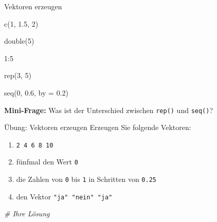 \documentclass[
  10pt,
  ignorenonframetext,
  aspectratio=169,
]{beamer}
\newenvironment{Shaded}{}{}
\newcommand{\AttributeTok}[1]{\textcolor[rgb]{0.49,0.56,0.16}{#1}}
\newcommand{\CommentTok}[1]{\textcolor[rgb]{0.38,0.63,0.69}{\textit{#1}}}
\newcommand{\DecValTok}[1]{\textcolor[rgb]{0.25,0.63,0.44}{#1}}
\newcommand{\FloatTok}[1]{\textcolor[rgb]{0.25,0.63,0.44}{#1}}
\newcommand{\FunctionTok}[1]{\textcolor[rgb]{0.02,0.16,0.49}{#1}}
\newcommand{\NormalTok}[1]{#1}
\newcommand{\SpecialCharTok}[1]{\textcolor[rgb]{0.25,0.44,0.63}{#1}}
\providecommand{\tightlist}{%
  \setlength{\itemsep}{0pt}\setlength{\parskip}{0pt}}
\begin{document}
\begin{frame}[fragile]{Vektoren erzeugen}
\label{vektoren-erzeugen}
\begin{Shaded}
\begin{Highlighting}[]
\FunctionTok{c}\NormalTok{(}\DecValTok{1}\NormalTok{, }\FloatTok{1.5}\NormalTok{, }\DecValTok{2}\NormalTok{)}

\FunctionTok{double}\NormalTok{(}\DecValTok{5}\NormalTok{)}

\DecValTok{1}\SpecialCharTok{:}\DecValTok{5}

\FunctionTok{rep}\NormalTok{(}\DecValTok{3}\NormalTok{, }\DecValTok{5}\NormalTok{)}

\FunctionTok{seq}\NormalTok{(}\DecValTok{0}\NormalTok{, }\FloatTok{0.6}\NormalTok{, }\AttributeTok{by =} \FloatTok{0.2}\NormalTok{)}
\end{Highlighting}
\end{Shaded}

\textbf{Mini-Frage:} Was ist der Unterschied zwischen \texttt{rep()} und
\texttt{seq()}?

\end{frame}

\begin{frame}[fragile]{Übung: Vektoren erzeugen}
\label{uxfcbung-vektoren-erzeugen}
Erzeugen Sie folgende Vektoren:

\begin{enumerate}
\tightlist
\item
  \texttt{2\ 4\ 6\ 8\ 10}
\item
  fünfmal den Wert \texttt{0}
\item
  die Zahlen von \texttt{0} bis \texttt{1} in Schritten von
  \texttt{0.25}
\item
  den Vektor \texttt{"ja"\ "nein"\ "ja"}
\end{enumerate}

\begin{Shaded}
\begin{Highlighting}[]
\CommentTok{\# Ihre Lösung}
\end{Highlighting}
\end{Shaded}
\end{frame}
\end{document}
